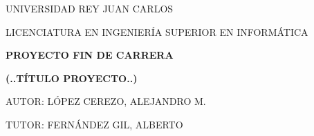 

\thispagestyle{empty} %

\begin{center}
	
	\vspace*{1.5cm}
	UNIVERSIDAD REY JUAN CARLOS
	\vspace{1cm}
	
	LICENCIATURA EN INGENIERÍA SUPERIOR EN INFORMÁTICA
	\vspace{1cm}

	\begin{figure}[h] %
		\centering
	\end{figure}

	\vspace{1cm}
	{\large \bfseries PROYECTO FIN DE CARRERA}
	\vspace{3.5cm}

	{\Large \bfseries (..TÍTULO PROYECTO..)}
	\vspace{3.5cm}

	AUTOR: LÓPEZ CEREZO, ALEJANDRO M.
	\vspace{0.5cm}
	
	TUTOR: FERNÁNDEZ GIL, ALBERTO
	\vspace{1.5cm}
	
\end{center}